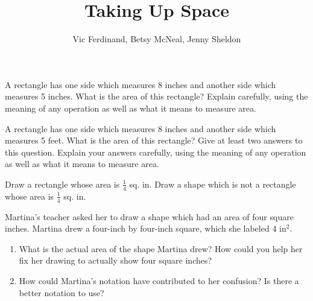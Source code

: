 \documentclass{ximera}
\title{Taking Up Space}
\author{Vic Ferdinand, Betsy McNeal, Jenny Sheldon}
\begin{document}
\begin{abstract}
\end{abstract}
\maketitle



\begin{problem}
A rectangle has one side which measures 8 inches and another side which measures 5 inches.  What is the area of this rectangle?  Explain carefully, using the meaning of any operation as well as what it means to measure area.


\end{problem}

\begin{problem}
A rectangle has one side which measures 8 inches and another side which measures 5 feet.  What is the area of this rectangle?  Give at least two answers to this question.  Explain your answers carefully, using the meaning of any operation as well as what it means to measure area.

\end{problem}


\begin{problem} \label{TakingUpSpace3}
Draw a rectangle whose area is $\frac{1}{4}$ sq. in.  Draw a shape which is not a rectangle whose area is $\frac{1}{4}$ sq. in.


\end{problem}

\begin{problem} \label{TakingUpSpace4}
Martina's teacher asked her to draw a shape which had an area of four square inches.  Martina drew a four-inch by four-inch square, which she labeled 4 in$^2$.

\begin{enumerate}
\item What is the actual area of the shape Martina drew?  How could you help her fix her drawing to actually show four square inches?
\item How could Martina's notation have contributed to her confusion?  Is there a better notation to use?
\end{enumerate}
\end{problem}

\newpage
\end{document}
